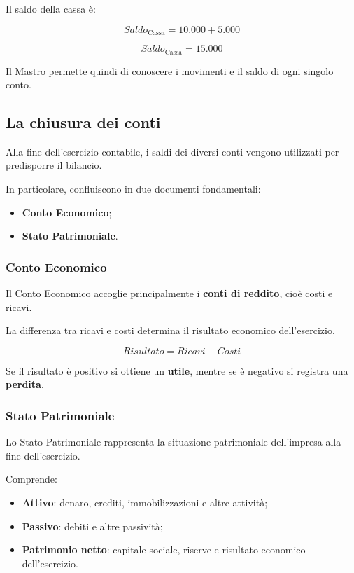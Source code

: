 \noindent Il saldo della cassa è:

\[
Saldo_{\text{Cassa}}=10.000+5.000
\]

\[
\boxed{Saldo_{\text{Cassa}}=15.000}
\]

\noindent Il Mastro permette quindi di conoscere
i movimenti e il saldo di ogni singolo conto.


\subsection{La chiusura dei conti}

\noindent Alla fine dell'esercizio contabile,
i saldi dei diversi conti vengono utilizzati
per predisporre il bilancio.

\medskip

\noindent In particolare, confluiscono
in due documenti fondamentali:

\begin{itemize}
    \item \textbf{Conto Economico};
    \item \textbf{Stato Patrimoniale}.
\end{itemize}

\subsubsection*{Conto Economico}

\noindent Il Conto Economico accoglie principalmente
i \textbf{conti di reddito}, cioè costi e ricavi.

\medskip

\noindent La differenza tra ricavi e costi
determina il risultato economico dell'esercizio.

\[
\boxed{
Risultato=Ricavi-Costi
}
\]

\noindent Se il risultato è positivo si ottiene
un \textbf{utile}, mentre se è negativo
si registra una \textbf{perdita}.

\subsubsection*{Stato Patrimoniale}

\noindent Lo Stato Patrimoniale rappresenta
la situazione patrimoniale dell'impresa
alla fine dell'esercizio.

\medskip

\noindent Comprende:

\begin{itemize}
    \item \textbf{Attivo}: denaro, crediti,
    immobilizzazioni e altre attività;

    \item \textbf{Passivo}: debiti e altre passività;

    \item \textbf{Patrimonio netto}: capitale sociale,
    riserve e risultato economico dell'esercizio.
\end{itemize}

